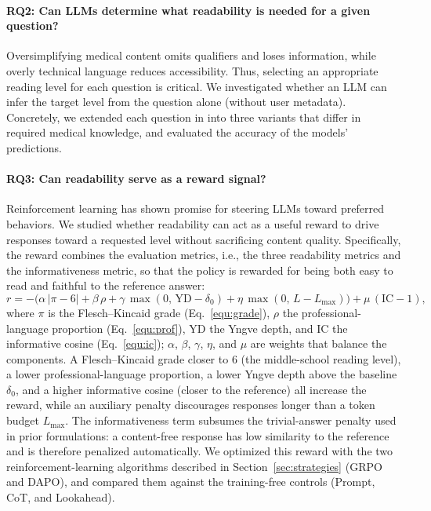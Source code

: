 \paragraph{RQ2: Can LLMs determine what readability is needed for a given question?}
Oversimplifying medical content omits qualifiers and loses information, while overly technical language reduces accessibility. Thus, selecting an appropriate reading level for each question is critical.
We investigated whether an LLM can infer the target level from the question alone (without user metadata).
Concretely, we extended each question in \repqa into three variants that differ in required medical knowledge, and evaluated the accuracy of the models' predictions.

\paragraph{RQ3: Can readability serve as a reward signal?}
Reinforcement learning has shown promise for steering LLMs toward preferred behaviors. We studied whether readability can act as a useful reward to drive responses toward a requested level without sacrificing content quality.
Specifically, the reward combines the evaluation metrics, i.e., the three readability metrics and the informativeness metric, so that the policy is rewarded for being both easy to read and faithful to the reference answer:
\begin{equation}
\label{equ:reward}
r = -\Big(\alpha\,|\pi - 6| + \beta\,\rho + \gamma\,\max(0,\, \text{YD} - \delta_0) + \eta\,\max(0,\, L - L_{\max})\Big) + \mu\,(\text{IC} - 1),
\end{equation}
where $\pi$ is the Flesch--Kincaid grade (Eq.~\ref{equ:grade}), $\rho$ the professional-language proportion (Eq.~\ref{equ:prof}), $\text{YD}$ the Yngve depth, and $\text{IC}$ the informative cosine (Eq.~\ref{equ:ic}); $\alpha$, $\beta$, $\gamma$, $\eta$, and $\mu$ are weights that balance the components.
A Flesch--Kincaid grade closer to $6$ (the middle-school reading level), a lower professional-language proportion, a lower Yngve depth above the baseline $\delta_0$, and a higher informative cosine (closer to the reference) all increase the reward, while an auxiliary penalty discourages responses longer than a token budget $L_{\max}$.
The informativeness term subsumes the trivial-answer penalty used in prior formulations: a content-free response has low similarity to the reference and is therefore penalized automatically.
We optimized this reward with the two reinforcement-learning algorithms described in Section~\ref{sec:strategies} (GRPO and DAPO), and compared them against the training-free controls (Prompt, CoT, and Lookahead).

